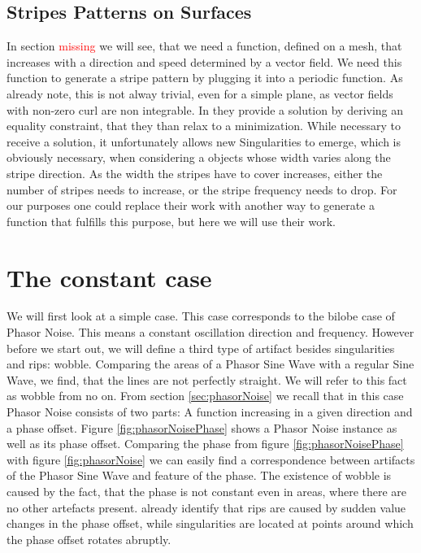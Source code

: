 \documentclass{utue} %
\begin{document}
\subsection{Stripes Patterns on Surfaces}
In section \textcolor{red}{missing} we will see, that we need a function, defined on a mesh, that increases with a direction and speed determined by a vector field. We need this function to generate a stripe pattern by plugging it into a periodic function. As \citeauthor{stripes} already note, this is not alway trivial, even for a simple plane, as vector fields with non-zero curl are non integrable. In \cite{stripes} they provide a solution by deriving an equality constraint, that they than relax to a minimization. While necessary to receive a solution, it unfortunately allows new Singularities to emerge, which is obviously necessary, when considering a objects whose width varies along the stripe direction. As the width the stripes have to cover increases, either the number of stripes needs to increase, or the stripe frequency needs to drop. For our purposes one could replace their work with another way to generate a function that fulfills this purpose, but here we will use their work.

\section{The constant case}
We will first look at a simple case. This case corresponds to the bilobe case of Phasor Noise. This means a constant oscillation direction and frequency. However before we start out, we will define a third type of artifact besides singularities and rips: wobble. Comparing the areas of a Phasor Sine Wave with a regular Sine Wave, we find, that the lines are not perfectly straight. We will refer to this fact as wobble from no on. From section \ref{sec:phasorNoise} we recall that in this case Phasor Noise consists of two parts: A function increasing in a given direction and a phase offset. Figure \ref{fig:phasorNoisePhase} shows a Phasor Noise instance as well as its phase offset. Comparing the phase from figure \ref{fig:phasorNoisePhase} with figure \ref{fig:phasorNoise} we can easily find a correspondence between artifacts of the Phasor Sine Wave and feature of the phase. The existence of wobble is caused by the fact, that the phase is not constant even in areas, where there are no other artefacts present. \citeauthor{phasorNoise} already identify that rips are caused by sudden value changes in the phase offset, while singularities are located at points around which the phase offset rotates abruptly.\\
\end{document}
